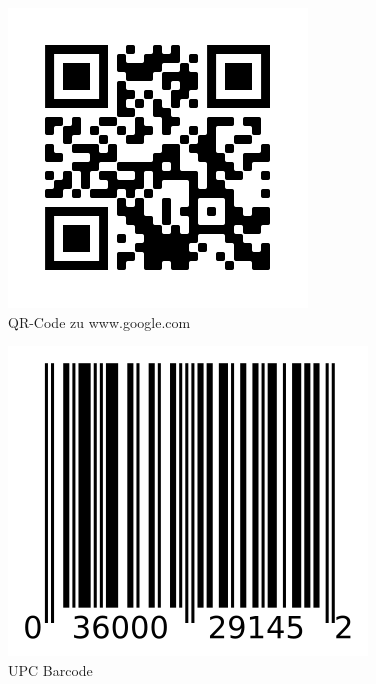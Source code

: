 \begin{figure}[H]
    \centering
    \includegraphics[scale=1]{pics/googleQR.png}
    \caption{QR-Code zu www.google.com}
    \label{fig:tech:qrCode}
\end{figure}

\begin{figure}[H]
    \centering
    \includegraphics[scale=0.8]{pics/UPCBarcode.png}
    \caption{UPC Barcode}
    \label{fig:tech:barcode}
\end{figure}


